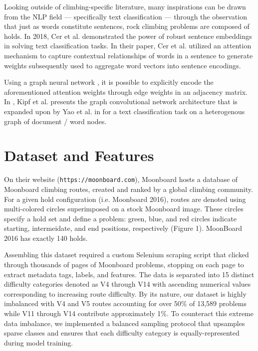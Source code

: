\documentclass{article}
\begin{document}
Looking outside of climbing-specific literature, many inspirations can be drawn from the NLP field --- specifically text classification --- through the observation that just as words constitute sentences, rock climbing problems are composed of holds. In 2018, Cer et al. \cite{cer2018universal} demonstrated the power of robust sentence embeddings in solving text classification tasks. In their paper, Cer et al. utilized an attention mechanism to capture contextual relationships of words in a sentence to generate weights subsequently used to aggregate word vectors into sentence encodings. 

Using a graph neural network \cite{battaglia2018relational}, it is possible to explicitly encode the aforementioned attention weights through edge weights in an adjacency matrix. In \cite{kipf2016semisupervised}, Kipf et al. presents the graph convolutional network architecture that is expanded upon by Yao et al. in \cite{yao2018graph} for a text classification task on a heterogenous graph of document / word nodes.

\section{Dataset and Features}
On their website (\texttt{https://moonboard.com}), Moonboard hosts a database of Moonboard climbing routes, created and ranked by a global climbing community. For a given hold configuration (i.e. Moonboard 2016), routes are denoted using multi-colored circles superimposed on a stock Moonboard image. These circles specify a hold set and define a problem: green, blue, and red circles indicate starting, intermeidate, and end positions, respectively (Figure 1). MoonBoard 2016 has exactly 140 holds.

Assembling this dataset required a custom Selenium scraping script that clicked through thousands of pages of Moonboard problems, stopping on each page to extract metadata tags, labels, and features. The data is separated into 15 distinct difficulty categories denoted as V4 through V14 with ascending numerical values corresponding to increasing route difficulty. By its nature, our dataset is highly imbalanced with V4 and V5 routes accounting for over 50\% of 13,589 problems while V11 through V14 contribute approximately 1\%. To counteract this extreme data imbalance, we implemented a balanced sampling protocol that upsamples sparse classes and ensures that each difficulty category is equally-represented during model training.
\end{document}
